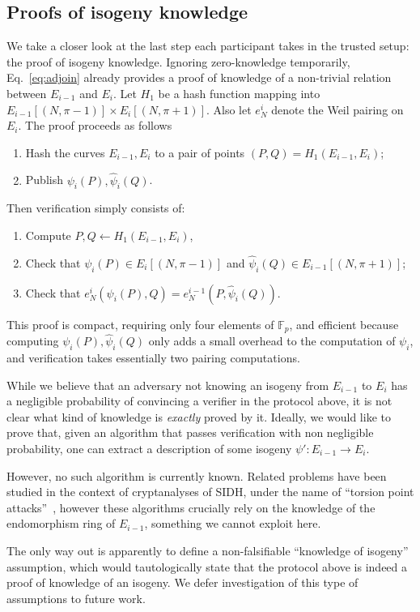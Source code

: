 \documentclass{llncs}
\newcommand{\F}{\mathbb{F}}
\begin{document}
\subsection{Proofs of isogeny knowledge}

We take a closer look at the last step each participant takes in the
trusted setup: the proof of isogeny knowledge. %
Ignoring zero-knowledge temporarily, Eq.~\eqref{eq:adjoin} already
provides a proof of knowledge of a non-trivial relation between
$E_{i-1}$ and $E_i$. %
Let $H_1$ be a hash function mapping into
$E_{i-1}[(N,\pi-1)] \times E_i[(N,\pi+1)]$.
Also let $e_N^i$ denote the Weil pairing on $E_i$.
The proof proceeds as follows
\begin{enumerate}
\item Hash the curves $E_{i-1},E_i$ to a pair of points
  $(P,Q) = H_1(E_{i-1},E_i)$;
\item Publish $\psi_i(P), \hat\psi_i(Q)$.
\end{enumerate}
Then verification simply consists of:
\begin{enumerate}
\item Compute $P,Q\gets H_1(E_{i-1},E_i)$,
\item Check that $\psi_i(P)\in E_i[(N,\pi-1)]$ and
  $\hat\psi_i(Q)\in E_{i-1}[(N,\pi+1)]$;
\item Check that $e_N^i(\psi_i(P),Q) = e_N^{i-1}(P,\hat\psi_i(Q))$.
\end{enumerate}

This proof is compact, requiring only four elements of $\F_p$, and
efficient because computing $\psi_i(P),\hat\psi_i(Q)$ only adds a
small overhead to the computation of $\psi_i$, and verification takes
essentially two pairing computations. %

\begin{remark}
  While we believe that an adversary not knowing an isogeny from
  $E_{i-1}$ to $E_i$ has a negligible probability of convincing a
  verifier in the protocol above, it is not clear what kind of knowledge
  is \emph{exactly} proved by it. %
  Ideally, we would like to prove that, given an algorithm that passes
  verification with non negligible probability, one can extract a
  description of some isogeny $\psi':E_{i-1}\to E_{i}$. %

  However, no such algorithm is currently known. %
  Related problems have been studied in the context of cryptanalyses
  of SIDH, under the name of ``torsion point
  attacks''~\cite{10.1007/978-3-319-70697-9_12,cryptoeprint:2019:1291,cryptoeprint:2020:633},
  however these algorithms crucially rely on the knowledge of the
  endomorphism ring of $E_{i-1}$, something we cannot exploit here.

  The only way out is apparently to define a non-falsifiable
  ``knowledge of isogeny'' assumption, which would tautologically
  state that the protocol above is indeed a proof of knowledge of an
  isogeny. %
  We defer investigation of this type of assumptions to future work.
\end{remark}
\end{document}

